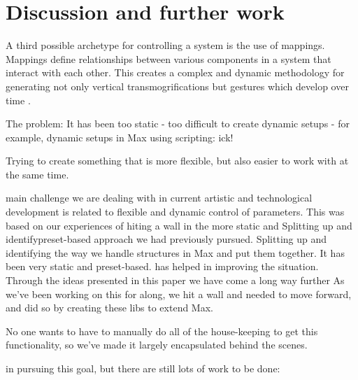 \documentclass{article}
\begin{document}


\section{Discussion and further work} %
\label{sec:discussion_and_further_work}

A third possible archetype for controlling a system is the use of mappings. Mappings define relationships between various components in a system that interact with each other. This creates a complex and dynamic methodology for generating not only vertical transmogrifications but gestures which develop over time \cite{Hunt:2003,Nort:2006}.



The problem: 
It has been too static
    - too difficult to create dynamic setups
    - for example, dynamic setups in Max using scripting: ick!

Trying to create something that is more flexible, but also easier to work with at the same time.

main challenge we are dealing with in current artistic and technological development is related to flexible and dynamic control of parameters. This was based on our experiences of hiting a wall in the more static and Splitting up and identifypreset-based approach we had previously pursued. Splitting up and identifying the way we handle structures in Max and put them together.  It has been very static and preset-based.
has helped in improving the situation. Through the ideas presented in this paper we have come a long way further 
As we've been working on this for along, we hit a wall and needed to move forward, and did so by creating these libs to extend Max.  

No one wants to have to manually do all of the house-keeping to get this functionality, so we've made it largely encapsulated behind the scenes.

in pursuing this goal, but there are still lots of work to be done: 
\end{document}
